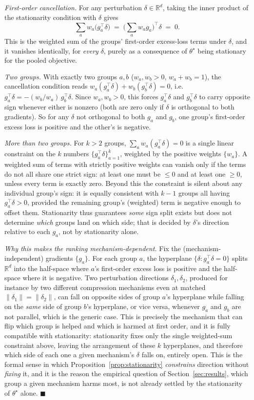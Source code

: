 \documentclass{article}
\newcommand{\RR}{\mathbb{R}}
\newcommand{\theorig}{\theta^\star}
\begin{document}
\emph{First-order cancellation.} For any perturbation $\delta \in \RR^d$, taking the inner product of the stationarity condition with $\delta$ gives
\[
\sum_a w_a \big(g_a^\top \delta\big) \;=\; \Big(\sum_a w_a g_a\Big)^{\!\top} \delta \;=\; 0 .
\]
This is the weighted sum of the groups' first-order excess-loss terms under $\delta$, and it vanishes identically, for \emph{every} $\delta$, purely as a consequence of $\theorig$ being stationary for the pooled objective.

\emph{Two groups.} With exactly two groups $a,b$ ($w_a,w_b>0$, $w_a+w_b=1$), the cancellation condition reads $w_a(g_a^\top\delta) + w_b(g_b^\top\delta) = 0$, i.e.\ $g_a^\top\delta = -(w_b/w_a)\,g_b^\top\delta$. Since $w_a,w_b>0$, this forces $g_a^\top\delta$ and $g_b^\top\delta$ to carry opposite sign whenever either is nonzero (both are zero only if $\delta$ is orthogonal to both gradients). So for any $\delta$ not orthogonal to both $g_a$ and $g_b$, one group's first-order excess loss is positive and the other's is negative.

\emph{More than two groups.} For $k>2$ groups, $\sum_a w_a(g_a^\top\delta)=0$ is a single linear constraint on the $k$ numbers $\{g_a^\top\delta\}_{a=1}^k$, weighted by the positive weights $\{w_a\}$. A weighted sum of terms with strictly positive weights can vanish only if the terms do not all share one strict sign: at least one must be $\le 0$ and at least one $\ge 0$, unless every term is exactly zero. Beyond this the constraint is silent about any individual group's sign: it is equally consistent with $k-1$ groups all having $g_a^\top\delta>0$, provided the remaining group's (weighted) term is negative enough to offset them. Stationarity thus guarantees \emph{some} sign split exists but does not determine \emph{which} groups land on which side; that is decided by $\delta$'s direction relative to each $g_a$, not by stationarity alone.

\emph{Why this makes the ranking mechanism-dependent.} Fix the (mechanism-independent) gradients $\{g_a\}$. For each group $a$, the hyperplane $\{\delta : g_a^\top\delta = 0\}$ splits $\RR^d$ into the half-space where $a$'s first-order excess loss is positive and the half-space where it is negative. Two perturbation directions $\delta_1,\delta_2$, produced for instance by two different compression mechanisms even at matched $\|\delta_1\|=\|\delta_2\|$, can fall on opposite sides of group $a$'s hyperplane while falling on the \emph{same} side of group $b$'s hyperplane, or vice versa, whenever $g_a$ and $g_b$ are not parallel, which is the generic case. This is precisely the mechanism that can flip which group is helped and which is harmed at first order, and it is fully compatible with stationarity: stationarity fixes only the single weighted-sum constraint above, leaving the arrangement of these $k$ hyperplanes, and therefore which side of each one a given mechanism's $\delta$ falls on, entirely open. This is the formal sense in which Proposition~\ref{prop:stationarity} \emph{constrains} direction without \emph{fixing} it, and it is the reason the empirical question of Section~\ref{sec:results}, which group a given mechanism harms most, is not already settled by the stationarity of $\theorig$ alone. $\blacksquare$
\end{document}
